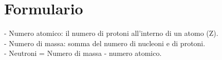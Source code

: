 \section{Formulario}
- Numero atomico: il numero di protoni all'interno di un atomo (Z).\\
- Numero di massa: somma del numero di nucleoni e di protoni.\\
- Neutroni = Numero di massa - numero atomico.\\